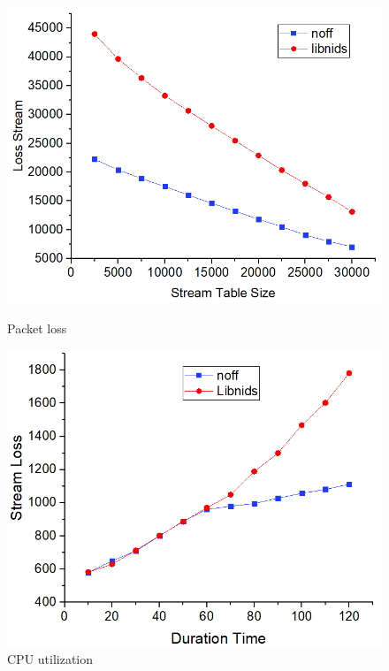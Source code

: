 \documentclass[conference]{IEEEtran}
\begin{document}
\begin{figure}
\begin{minipage}[t]{0.49\linewidth}
\flushleft
\includegraphics[width=\textwidth]{./picture/Figure14.jpg}
\caption{Packet loss} 
\label{fig:15}
\end{minipage}
\begin{minipage}[t]{0.49\linewidth}
\flushright
\includegraphics[width=\textwidth]{./picture/Figure15.jpg}
\caption{CPU utilization}
\label{fig:16}
\end{minipage}
\end{figure} 
\end{document}
